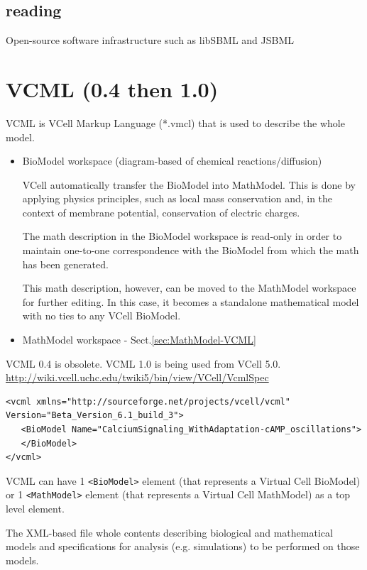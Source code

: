 \subsection{reading}

Open-source software infrastructure such as libSBML and JSBML


\section{VCML (0.4 then 1.0)}
\label{sec:VCML}

VCML is VCell Markup Language (*.vmcl) that is used to describe the whole model.
\begin{itemize}
  \item BioModel workspace (diagram-based of chemical reactions/diffusion)
  
VCell automatically transfer the BioModel into MathModel.
This is done by applying physics principles, such
as local mass conservation and, in the context of membrane potential, conservation of
electric charges.

The math description in the BioModel workspace is read-only in order
to maintain one-to-one correspondence with the BioModel from which the math has been
generated. 

This math description, however, can be moved to the MathModel workspace for
further editing. In this case, it becomes a standalone mathematical model with
no ties to any VCell BioModel.

  \item MathModel workspace - Sect.\ref{sec:MathModel-VCML}

\end{itemize}

VCML 0.4 is obsolete.
VCML 1.0 is being used from VCell 5.0.
\url{http://wiki.vcell.uchc.edu/twiki5/bin/view/VCell/VcmlSpec}

\begin{verbatim}
<vcml xmlns="http://sourceforge.net/projects/vcell/vcml"
Version="Beta_Version_6.1_build_3">
   <BioModel Name="CalciumSignaling_WithAdaptation-cAMP_oscillations">
   </BioModel>	
</vcml>
\end{verbatim}
VCML can have 1 \verb!<BioModel>! element (that represents a Virtual Cell
BioModel) or 1 \verb!<MathModel>! element (that represents a Virtual Cell
MathModel) as a top level element.


The XML-based file whole contents describing biological and mathematical models
and specifications for analysis (e.g. simulations) to be performed on those models. 



